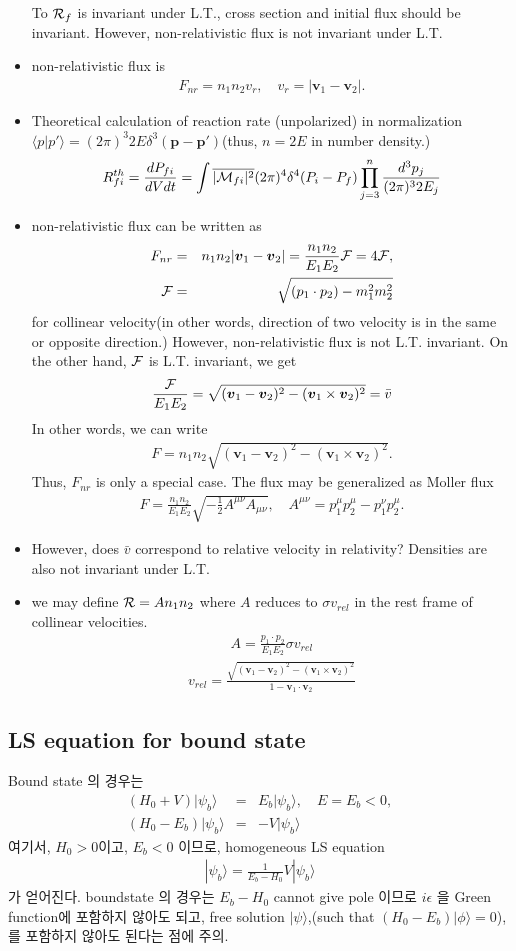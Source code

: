 \documentclass[10pt]{book}
\def\bm{\boldsymbol}
\newcommand{\bea}{\begin{eqnarray}}
\newcommand{\eea}{\end{eqnarray}}
\newcommand{\no}{\nonumber \\}
\def\vp{{\bm p}}
\def\la{\langle}
\def\ra{\rangle}
\begin{document}
\begin{itemize}
	       To ${\cal R}_f$ is invariant under L.T., cross section and initial flux should be 
	       invariant. However, non-relativistic flux is not invariant under L.T. 
	 \item non-relativistic flux is 
	       \bea 
	       F_{nr} = n_1 n_2 v_r,\quad v_r=|{\bm v}_1-{\bm v}_2|.
	       \eea       
	 \item Theoretical calculation of reaction rate (unpolarized) in normalization 
	      $\la p|p'\ra =(2\pi)^3 2E\delta^{3}(\vp-\vp')$(thus, $n=2E$ in number density.)
	      \bea 
	      R^{th}_{fi}=\frac{d P_{fi}}{dV dt}=\int \overline{|{\cal M}_{fi}|^2} (2\pi)^4\delta^{4}(P_i-P_f)
	              \prod_{j=3}^n \frac{d^3 p_j}{(2\pi)^3 2 E_j}
	      \eea       
	 \item non-relativistic flux can be written as
	      \bea 
	      F_{nr}&=& n_1 n_2 |{\bm v}_1-{\bm v}_2|=\frac{n_1 n_2}{E_1 E_2}{\cal F}= 4 {\cal F},\no 
	      {\cal F}&=&\sqrt{ (p_1\cdot p_2)-m_1^2 m_2^2}
	      \eea       
	      for collinear velocity(in other words, direction of two velocity is in the same or opposite direction.)
	      However, non-relativistic flux is not L.T. invariant. 
	      On the other hand, ${\cal F}$ is L.T. invariant,
	      we get 
	      \bea 
	      \frac{\cal F}{E_1 E_2} =\sqrt{ ({\bm v}_1-{\bm v}_2)^2-({\bm v}_1\times {\bm v}_2)^2} =\bar{v}
	      \eea 
	      In other words, we can write 
	      \bea 
	      F = n_1 n_2 \sqrt{ ({\bm v}_1-{\bm v}_2)^2-({\bm v}_1\times {\bm v}_2)^2} .
	      \eea 
	      Thus, $F_{nr}$ is only a special case. 
	      The flux may be generalized as Moller flux
	      \bea 
	      F=\frac{n_1 n_2}{E_1 E_2}\sqrt{-\frac{1}{2}A^{\mu\nu}A_{\mu\nu}},\quad 
	      A^{\mu\nu}=p_1^\mu p_2^\mu-p_1^\nu p_2^\mu. 
	      \eea 
	\item However, does $\bar{v}$ correspond to relative velocity in relativity? 
	      Densities are also not invariant under L.T. 
	\item we may define ${\cal R}=A n_1 n_2$ where $A$ reduces to $\sigma v_{rel}$
	      in the rest frame of collinear velocities. 
	      \bea 
	      A = \frac{p_1\cdot p_2}{E_1 E_2}\sigma v_{rel} 
	      \eea       
	      \bea 
	      v_{rel}= \frac{\sqrt{ ({\bm v}_1-{\bm v}_2)^2-({\bm v}_1\times {\bm v}_2)^2}}{1-{\bm v}_1\cdot{\bm v_2}}
	      \eea 
\end{itemize}


\subsection{LS equation for bound state}
Bound state 의 경우는 
\bea
(H_0+V)|\psi_b\ra&=&E_b|\psi_b\ra, \quad E=E_b<0,\no
(H_0-E_b)|\psi_b\ra&=&-V|\psi_b\ra  
\eea
여기서, $H_0>0$이고, $E_b<0$ 이므로, 
homogeneous LS equation
\bea
|\psi_b\ra=\frac{1}{E_b-H_0}V|\psi_b\ra
\eea
가 얻어진다. boundstate 의 경우는 $E_b-H_0$ cannot give pole 이므로
$i\epsilon$ 을 Green function에 포함하지 않아도 되고,
free solution $|\psi\ra$,(such that $(H_0-E_b)|\phi\ra=0$), 를 
포함하지 않아도 된다는 점에 주의. 
\end{document}
